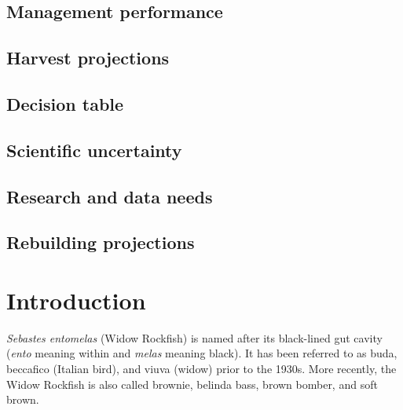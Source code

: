 \documentclass[
]{scrartcl}
\begin{document}
\subsection*{Management performance}\label{management-performance}

\subsection*{Harvest projections}\label{harvest-projections}

\subsection*{Decision table}\label{decision-table}

\subsection*{Scientific uncertainty}\label{scientific-uncertainty}

\subsection*{Research and data needs}\label{research-and-data-needs}

\subsection*{Rebuilding projections}\label{rebuilding-projections}

\newpage{}

\setlength{\parskip}{5mm plus1mm minus1mm}
\setcounter{page}{1}
\setcounter{section}{0}
\renewcommand{\thefigure}{\arabic{figure}}
\renewcommand{\thetable}{\arabic{table}}
\setcounter{table}{0}
\setcounter{figure}{0}

\section{Introduction}\label{introduction}

\emph{Sebastes entomelas} (Widow Rockfish) is named after its
black-lined gut cavity (\emph{ento} meaning within and \emph{melas}
meaning black). It has been referred to as buda, beccafico (Italian
bird), and viuva (widow) prior to the 1930s. More recently, the Widow
Rockfish is also called brownie, belinda bass, brown bomber, and soft
brown.
\end{document}
